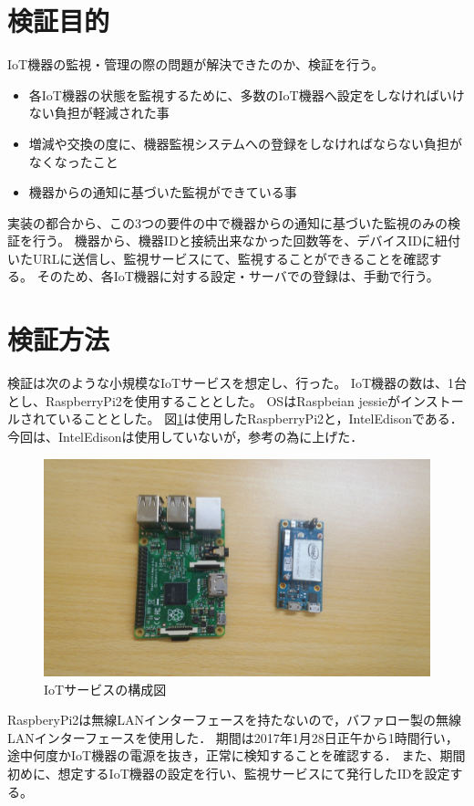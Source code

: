 \section{検証目的}
IoT機器の監視・管理の際の問題が解決できたのか、検証を行う。
\begin{itemize}
\item 各IoT機器の状態を監視するために、多数のIoT機器へ設定をしなければいけない負担が軽減された事
\item 増減や交換の度に、機器監視システムへの登録をしなければならない負担がなくなったこと
\item 機器からの通知に基づいた監視ができている事
\end{itemize}

実装の都合から、この3つの要件の中で機器からの通知に基づいた監視のみの検証を行う。
機器から、機器IDと接続出来なかった回数等を、デバイスIDに紐付いたURLに送信し、監視サービスにて、監視することができることを確認する。
そのため、各IoT機器に対する設定・サーバでの登録は、手動で行う。

\section{検証方法}
検証は次のような小規模なIoTサービスを想定し、行った。
IoT機器の数は、1台とし、RaspberryPi2を使用することとした。
OSはRaspbeian jessieがインストールされていることとした。
図\ref{fig:device}は使用したRaspberryPi2と，IntelEdisonである．
今回は、IntelEdisonは使用していないが，参考の為に上げた．
\begin{figure}[htbp]
\includegraphics[width=14cm]{images/device.png}
\caption{IoTサービスの構成図}
\label{fig:device}
\end{figure}

RaspberyPi2は無線LANインターフェースを持たないので，バファロー製の無線LANインターフェースを使用した．
期間は2017年1月28日正午から1時間行い，途中何度かIoT機器の電源を抜き，正常に検知することを確認する．
また、期間初めに、想定するIoT機器の設定を行い、監視サービスにて発行したIDを設定する。

